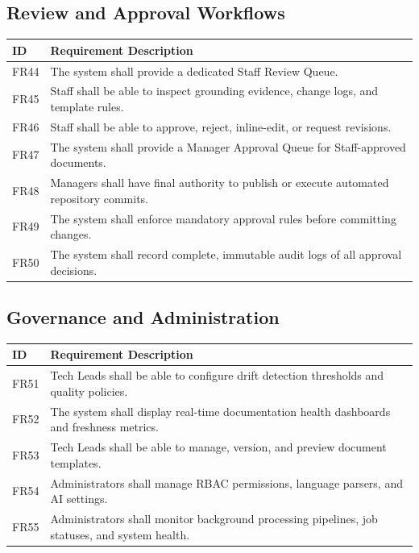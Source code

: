 \subsection{Review and Approval Workflows}
\begin{longtable}{p{2cm} p{11.3cm}}
	\toprule
	\textbf{ID} & \textbf{Requirement Description} \\
	\midrule
	\endhead
	FR44 & The system shall provide a dedicated Staff Review Queue. \\
	FR45 & Staff shall be able to inspect grounding evidence, change logs, and template rules. \\
	FR46 & Staff shall be able to approve, reject, inline-edit, or request revisions. \\
	FR47 & The system shall provide a Manager Approval Queue for Staff-approved documents. \\
	FR48 & Managers shall have final authority to publish or execute automated repository commits. \\
	FR49 & The system shall enforce mandatory approval rules before committing changes. \\
	FR50 & The system shall record complete, immutable audit logs of all approval decisions. \\
	\bottomrule
\end{longtable}

\subsection{Governance and Administration}
\begin{longtable}{p{2cm} p{11.3cm}}
	\toprule
	\textbf{ID} & \textbf{Requirement Description} \\
	\midrule
	\endhead
	FR51 & Tech Leads shall be able to configure drift detection thresholds and quality policies. \\
	FR52 & The system shall display real-time documentation health dashboards and freshness metrics. \\
	FR53 & Tech Leads shall be able to manage, version, and preview document templates. \\
	FR54 & Administrators shall manage RBAC permissions, language parsers, and AI settings. \\
	FR55 & Administrators shall monitor background processing pipelines, job statuses, and system health. \\
	\bottomrule
\end{longtable}

